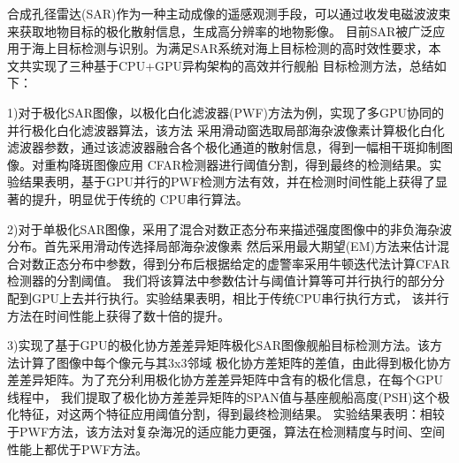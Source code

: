 \begin{cabstract}
  合成孔径雷达(SAR)作为一种主动成像的遥感观测手段，可以通过收发电磁波波束来获取地物目标的极化散射信息，生成高分辨率的地物影像。
  目前SAR被广泛应用于海上目标检测与识别。为满足SAR系统对海上目标检测的高时效性要求，本文共实现了三种基于CPU+GPU异构架构的高效并行舰船
  目标检测方法，总结如下：

  1)对于极化SAR图像，以极化白化滤波器(PWF)方法为例，实现了多GPU协同的并行极化白化滤波器算法，该方法
  采用滑动窗选取局部海杂波像素计算极化白化滤波器参数，通过该滤波器融合各个极化通道的散射信息，得到一幅相干斑抑制图像。对重构降斑图像应用
  CFAR检测器进行阈值分割，得到最终的检测结果。实验结果表明，基于GPU并行的PWF检测方法有效，并在检测时间性能上获得了显著的提升，明显优于传统的
  CPU串行算法。

  2)对于单极化SAR图像，采用了混合对数正态分布来描述强度图像中的非负海杂波分布。首先采用滑动传选择局部海杂波像素
  然后采用最大期望(EM)方法来估计混合对数正态分布中参数，得到分布后根据给定的虚警率采用牛顿迭代法计算CFAR检测器的分割阈值。
  我们将该算法中参数估计与阈值计算等可并行执行的部分分配到GPU上去并行执行。实验结果表明，相比于传统CPU串行执行方式，
  该并行方法在时间性能上获得了数十倍的提升。

  3)实现了基于GPU的极化协方差差异矩阵极化SAR图像舰船目标检测方法。该方法计算了图像中每个像元与其3x3邻域
  极化协方差矩阵的差值，由此得到极化协方差差异矩阵。为了充分利用极化协方差差异矩阵中含有的极化信息，在每个GPU线程中，
  我们提取了极化协方差差异矩阵的SPAN值与基座舰船高度(PSH)这个极化特征，对这两个特征应用阈值分割，得到最终检测结果。
  实验结果表明：相较于PWF方法，该方法对复杂海况的适应能力更强，算法在检测精度与时间、空间性能上都优于PWF方法。

\end{cabstract}


